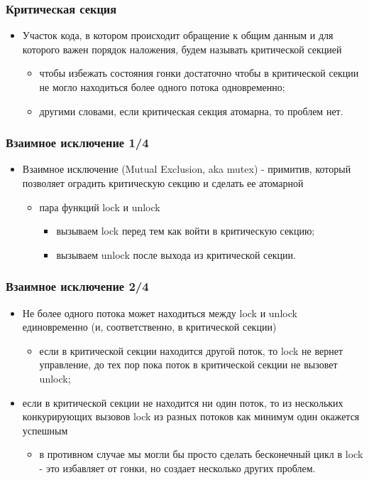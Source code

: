 \begin{frame}
\frametitle{Критическая секция}
\begin{itemize}
  \item Участок кода, в котором происходит обращение к общим данным и для
  которого важен порядок наложения, будем называть критической секцией
  \begin{itemize}
    \item чтобы избежать состояния гонки достаточно чтобы в критической секции
    не могло находиться более одного потока одновременно;
    \item другими словами, если критическая секция атомарна, то проблем нет.
  \end{itemize}
\end{itemize}
\end{frame}

\begin{frame}
\frametitle{Взаимное исключение 1/4}
\begin{itemize}
  \item Взаимное исключение (Mutual Exclusion, aka mutex) - примитив, который
  позволяет оградить критическую секцию и сделать ее атомарной
  \begin{itemize}
    \item пара функций lock и unlock
    \begin{itemize}
      \item вызываем lock перед тем как войти в критическую секцию;
      \item вызываем unlock после выхода из критической секции.
    \end{itemize}
  \end{itemize}
\end{itemize}
\end{frame}

\begin{frame}
\frametitle{Взаимное исключение 2/4}
\begin{itemize}
  \item Не более одного потока может находиться между lock и unlock
  единовременно (и, соответственно, в критической секции)
  \begin{itemize}
    \item если в критической секции находится другой поток, то lock не вернет
    управление, до тех пор пока поток в критической секции не вызовет unlock;
  \end{itemize}
  \item если в критической секции не находится ни один поток, то из нескольких
  конкурирующих вызовов lock из разных потоков как минимум один окажется
  успешным
  \begin{itemize}
    \item в противном случае мы могли бы просто сделать бесконечный цикл в
    lock - это избавляет от гонки, но создает несколько других проблем.
  \end{itemize}
\end{itemize}
\end{frame}

